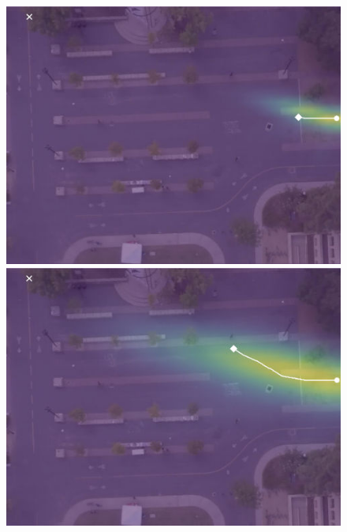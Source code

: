 \documentclass[letterpaper,10pt,conference]{ieeeconf}
\begin{document}
  
  \begin{figure}
	\centering
	\begin{minipage}[c]{0.5cm}
	\end{minipage}
	\begin{minipage}[c]{0.3\linewidth}
		\includegraphics[width=\linewidth]{./figures/bookstore/ours_1_2_t=50.jpg}
	\end{minipage}
	\begin{minipage}[c]{0.3\linewidth}
		\includegraphics[width=\linewidth]{./figures/bookstore/ours_1_2_t=130.jpg}
	\end{minipage}
	\begin{minipage}[c]{0.3\linewidth}

\end{minipage}
\end{figure}
\end{document}
